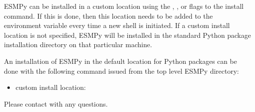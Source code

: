 \documentclass[letterpaper,10pt,english]{sphinxmanual}
\begin{document}
ESMPy can be installed in a custom location using the
, , or  flags to the install command.  If this
is done, then this location needs to be added to the  environment
variable every time a new shell is initiated.  If a
custom install location is not specified, ESMPy will be installed in the
standard Python package installation directory on that particular machine.

An installation of ESMPy in the default location for Python packages can be done
with the following command issued from the top level ESMPy directory:

\begin{sphinxVerbatim}[commandchars=\\\{\}]
    
\end{sphinxVerbatim}
\begin{itemize}
\item {} 
custom install location:

\end{itemize}

\begin{sphinxVerbatim}[commandchars=\\\{\}]
   

   

  \PYGZbs{}
\end{sphinxVerbatim}

Please contact  with any questions.
\end{document}
